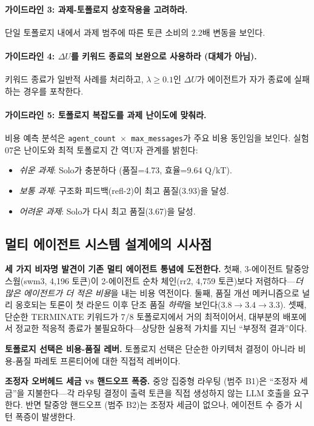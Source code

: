 \paragraph{가이드라인 3: 과제-토폴로지 상호작용을 고려하라.}
단일 토폴로지 내에서 과제 범주에 따른 토큰 소비의 2.2배 변동을 보인다.

\paragraph{가이드라인 4: $\Delta U$를 키워드 종료의 보완으로 사용하라 (대체가 아님).}
키워드 종료가 일반적 사례를 처리하고, $\lambda \geq 0.1$인 $\Delta U$가 에이전트가 자가 종료에 실패하는 경우를 포착한다.

\paragraph{가이드라인 5: 토폴로지 복잡도를 과제 난이도에 맞춰라.}
비용 예측 분석은 \texttt{agent\_count $\times$ max\_messages}가 주요 비용 동인임을 보인다. 실험 07은 난이도와 최적 토폴로지 간 역U자 관계를 밝힌다:
\begin{itemize}
  \item \emph{쉬운 과제}: Solo가 충분하다 (품질=4.73, 효율=9.64 Q/kT).
  \item \emph{보통 과제}: 구조화 피드백(refl-2)이 최고 품질(3.93)을 달성.
  \item \emph{어려운 과제}: Solo가 다시 최고 품질(3.67)을 달성.
\end{itemize}

\subsection{멀티 에이전트 시스템 설계에의 시사점}

\textbf{세 가지 비자명 발견이 기존 멀티 에이전트 통념에 도전한다.} 첫째, 3-에이전트 탈중앙 스웜(swm3, 4,196 토큰)이 2-에이전트 순차 체인(rr2, 4,759 토큰)보다 저렴하다---\emph{더 많은 에이전트가 더 적은 비용}을 내는 비용 역전이다. 둘째, 품질 개선 메커니즘으로 널리 옹호되는 토론이 첫 라운드 이후 단조 품질 \emph{하락}을 보인다($3.8 \to 3.4 \to 3.3$). 셋째, 단순한 TERMINATE 키워드가 7/8 토폴로지에서 거의 최적이어서, 대부분의 배포에서 정교한 적응적 종료가 불필요하다---상당한 실용적 가치를 지닌 ``부정적 결과''이다.

\textbf{토폴로지 선택은 비용-품질 레버.} 토폴로지 선택은 단순한 아키텍처 결정이 아니라 비용-품질 파레토 프론티어에 대한 직접적 레버이다.

\textbf{조정자 오버헤드 세금 vs 핸드오프 폭증.} 중앙 집중형 라우팅 (범주 B1)은 ``조정자 세금''을 지불한다---각 라우팅 결정이 출력 토큰을 직접 생성하지 않는 LLM 호출을 요구한다. 반면 탈중앙 핸드오프 (범주 B2)는 조정자 세금이 없으나, 에이전트 수 증가 시 턴 폭증이 발생한다.

